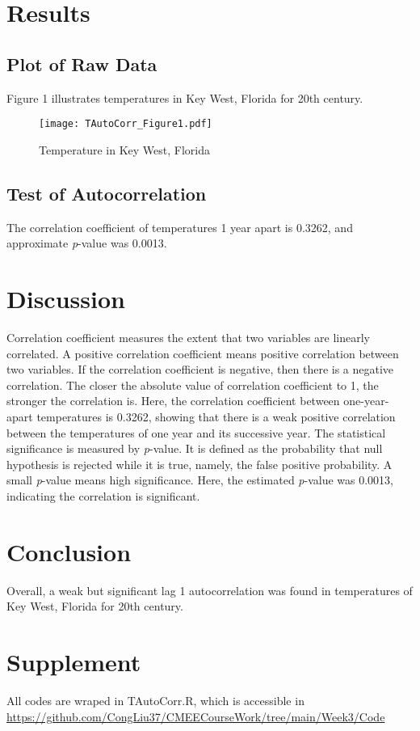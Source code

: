 \documentclass[12pt]{article}
\begin{document}
  \section{Results}
    
    \subsection{Plot of Raw Data}
    Figure 1 illustrates temperatures in Key West, Florida for 20th century.
    
    \begin{figure}[H]
        \centering
        \texttt{[image: TAutoCorr\_Figure1.pdf]}
        \caption{Temperature in Key West, Florida}
        \label{Fig. 2}    
    \end{figure}

    \subsection{Test of Autocorrelation}
    The correlation coefficient of temperatures 1 year apart is 0.3262, and approximate 
    \textit{p}-value was 0.0013.

  \section{Discussion}
  Correlation coefficient measures the extent that two variables are linearly correlated.
  A positive correlation coefficient means positive correlation between two variables. If 
  the correlation coefficient is negative, then there is a negative correlation. The closer
  the absolute value of correlation coefficient to 1, the stronger the correlation is. Here, the
  correlation coefficient between one-year-apart temperatures is 0.3262, showing that there is a weak 
  positive correlation between the temperatures of one year and its successive year.
  \newline
  The statistical significance is measured by \textit{p}-value. It is defined as the probability that
  null hypothesis is rejected while it is true, namely, the false positive probability. A 
  small \textit{p}-value means high significance. Here, the 
  estimated \textit{p}-value was 0.0013, indicating the correlation is significant.

  \section{Conclusion}
  Overall, a weak but significant lag 1 autocorrelation was found in temperatures of Key West, Florida 
  for 20th century.

  \section{Supplement}
  All codes are wraped in TAutoCorr.R, which is accessible in 
  \newline
  \href{https://github.com/CongLiu37/CMEECourseWork/tree/main/Week3/Code}{https://github.com/CongLiu37/CMEECourseWork/tree/main/Week3/Code}
\end{document}
